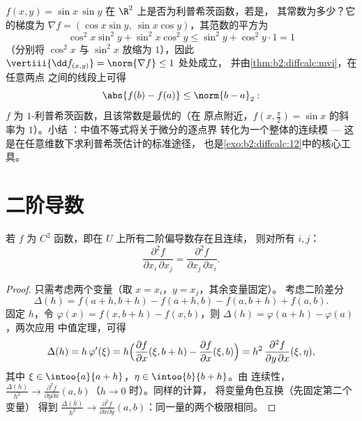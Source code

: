 \begin{example}[由中值不等式得到的利普希茨常数]\label{ex:b2:diffcalc:lipschitz}
$f(x, y) = \sin x\,\sin y$ 在 $\R^2$ 上是否为利普希茨函数，若是，
其常数为多少？它的梯度为 $\nabla f = (\cos x\sin y,\
\sin x\cos y)$，其范数的平方为
\[
\cos^2x\sin^2y + \sin^2x\cos^2y
\leq \sin^2 y + \cos^2y\cdot 1 = 1
\]
（分别将 $\cos^2x$ 与 $\sin^2x$ 放缩为 $1$），因此
$\vertiii{\dd f_{(x,y)}} = \norm{\nabla f} \leq 1$ 处处成立，
并由\cref{thm:b2:diffcalc:mvi}，在任意两点
之间的线段上可得
\[
\abs{f(b) - f(a)} \leq \norm{b - a}_2 :
\]
$f$ 为 $1$-利普希茨函数，且该常数是最优的（在
原点附近，$f(x, \tfrac\pi2) = \sin x$ 的斜率为 $1$）。小结
：中值不等式将关于微分的逐点界
转化为一个整体的连续模 ---
这是在任意维数下求利普希茨估计的标准途径，
也是\cref{exo:b2:diffcalc:12}中的核心工具。
\end{example}

\section{二阶导数}

\begin{theorem}[施瓦茨]\label{thm:b2:diffcalc:schwarz}
若 $f$ 为 $C^2$ 函数，即在 $U$ 上所有二阶偏导数存在且连续，
则对所有 $i, j$：
\[
\frac{\partial^2 f}{\partial x_i\,\partial x_j}
= \frac{\partial^2 f}{\partial x_j\,\partial x_i} .
\]
\end{theorem}

\begin{proof}
只需考虑两个变量（取 $x = x_i$，$y = x_j$，其余变量固定）。
考虑二阶差分
\[
\Delta(h) = f(a + h, b + h) - f(a + h, b) - f(a, b + h) + f(a,b) .
\]
固定 $h$，令 $\varphi(x) = f(x, b+h) - f(x, b)$，则 $\Delta(h)
= \varphi(a + h) - \varphi(a)$，两次应用
中值定理，可得
\[
\Delta(h) = h\,\varphi'(\xi)
= h\Bigl(\frac{\partial f}{\partial x}(\xi, b+h) -
\frac{\partial f}{\partial x}(\xi, b)\Bigr)
= h^2\,\frac{\partial^2 f}{\partial y\,\partial x}(\xi, \eta),
\]
其中 $\xi \in \intoo{a}{a+h}$，$\eta \in \intoo{b}{b+h}$。由
连续性，$\frac{\Delta(h)}{h^2} \to \frac{\partial^2 f}{\partial
y\partial x}(a, b)$（$h \to 0$ 时）。同样的计算，
将变量角色互换（先固定第二个变量）
得到 $\frac{\Delta(h)}{h^2} \to \frac{\partial^2 f}{\partial x
\partial y}(a,b)$：同一量的两个极限相同。
\end{proof}

